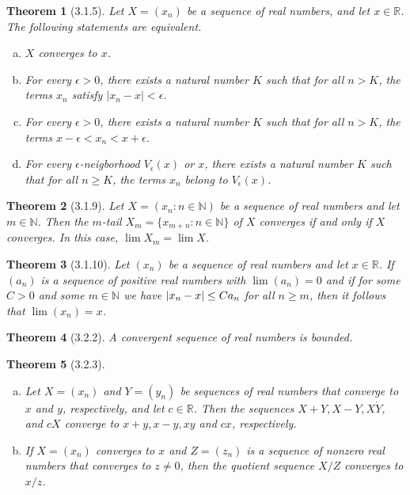 \documentclass{article}
\newtheorem*{theorem}{Theorem}
\DeclarePairedDelimiter\abs{\lvert}{\rvert}%
\begin{document}
\begin{theorem}[3.1.5] Let $X=(x_n)$ be a sequence of real numbers, and let $x\in{\mathbb{R}}$.
  The following statements are equivalent.
  \begin{enumerate}[(a)]
    \item $X$ converges to $x$.
    \item For every $\epsilon>0$, there exists a natural number $K$ such that for all $n>K$,
      the terms $x_n$ satisfy $|x_n-x|<\epsilon$.
    \item For every $\epsilon>0$, there exists a natural number $K$ such that for all $n>K$,
      the terms $x-\epsilon<x_n<x+\epsilon$.
    \item For every $\epsilon$-neigborhood $V_{\epsilon}(x)$ or $x$, there exists a natural number
      $K$ such that for all $n\ge{K}$, the terms $x_n$ belong to $V_{\epsilon}(x)$.
  \end{enumerate}
\end{theorem}

\begin{theorem}[3.1.9] Let $X=(x_n:n\in{\mathbb{N}})$ be a sequence of real numbers and let
  $m\in{\mathbb{N}}$. Then the $m$-tail $X_m=\{x_{m+n}:n\in{\mathbb{N}}\}$ of $X$ converges
  if and only if $X$ converges. In this case, $\lim{X_m}=\lim{X}$.
\end{theorem}

\begin{theorem}[3.1.10] Let $(x_n)$ be a sequence of real numbers and let $x\in{\mathbb{R}}$.
  If $(a_n)$ is a sequence of positive real numbers with $\lim{(a_n)}=0$ and if for some $C>0$
  and some $m\in{\mathbb{N}}$ we have
  $\abs{x_n-x} \le Ca_n$ for all $n \ge m$, then it follows that $\lim{(x_n)}=x$.
\end{theorem}

\begin{theorem}[3.2.2]A convergent sequence of real numbers is bounded.
\end{theorem}

\begin{theorem}[3.2.3]
  \begin{enumerate}[(a)]
    \item Let $X=(x_n)$ and $Y=(y_n)$ be sequences of real numbers that converge to $x$ and $y$,
      respectively, and let $c \in{\mathbb{R}}$. Then the sequences  $X+Y,X-Y,X\dot{Y}$, and
      $cX$ converge to $x+y,x-y,xy$ and $cx$, respectively.
    \item If $X=(x_n)$ converges to $x$ and $Z=(z_n)$ is a sequence of nonzero real numbers
      that converges to $z\ne{0}$, then the quotient sequence $X/Z$ converges to $x/z$.
  \end{enumerate}
\end{theorem}
\end{document}
